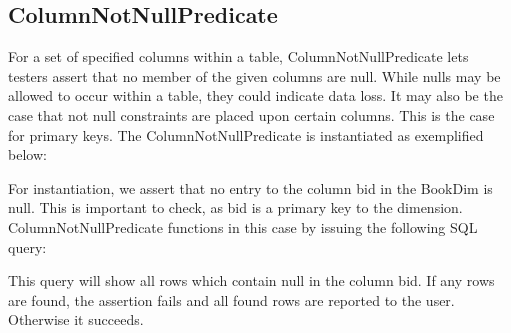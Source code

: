 \subsection{ColumnNotNullPredicate}
For a set of specified columns within a table, ColumnNotNullPredicate lets testers assert that no member of the given columns are null. While nulls may be allowed to occur within a table, they could indicate data loss. It may also be the case that not null constraints are placed upon certain columns. This is the case for primary keys. The ColumnNotNullPredicate is instantiated as exemplified below:


For instantiation, we assert that no entry to the column bid in the BookDim is null. This is important to check, as bid is a primary key to the dimension. 
ColumnNotNullPredicate functions in this case by issuing the following SQL query:


This query will show all rows which contain null in the column bid. If any rows are found, the assertion fails and all found rows are reported to the user. Otherwise it succeeds.


